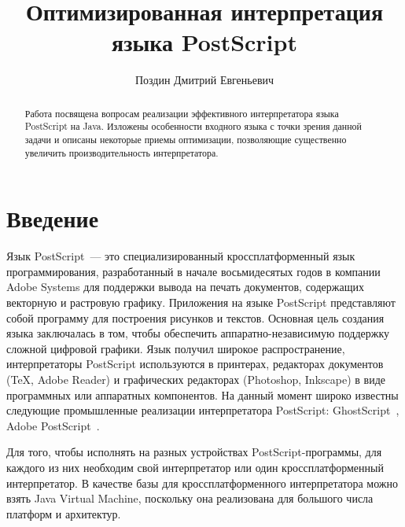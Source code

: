 
\title{Оптимизированная интерпретация языка PostScript}


\author{Поздин Дмитрий Евгеньевич}



\maketitle             

\begin{abstract}
Работа посвящена вопросам реализации эффективного
интерпретатора языка PostScript на Java. Изложены особенности
входного языка с точки зрения данной задачи и описаны некоторые
приемы оптимизации, позволяющие существенно увеличить
производительность интерпретатора.
\end{abstract}	

	\section*{Введение}

	Язык PostScript~--- это  специализированный кроссплатформенный язык программирования, разработанный в начале восьмидесятых годов в компании Adobe Systems для поддержки вывода на печать документов, содержащих векторную и растровую графику. Приложения на языке PostScript представляют собой программу для построения рисунков и текстов. Основная цель создания языка заключалась в том, чтобы обеспечить аппаратно-независимую поддержку сложной цифровой графики. Язык получил широкое распространение, интерпретаторы PostScript используются в принтерах, редакторах документов (\TeX, Adobe Reader) и графических редакторах (Photoshop, Inkscape) в виде программных или аппаратных компонентов. На данный момент широко известны следующие промышленные реализации интерпретатора PostScript: GhostScript~\cite{GS-site}, Adobe PostScript~\cite{Adobe-PS-site}. 
	
	Для того, чтобы исполнять на разных устройствах PostScript-программы, для каждого из них необходим свой интерпретатор или один кроссплатформенный интерпретатор. В качестве базы для кроссплатформенного интерпретатора можно взять Java Virtual Machine, поскольку она реализована для большого числа платформ и архитектур.
	
